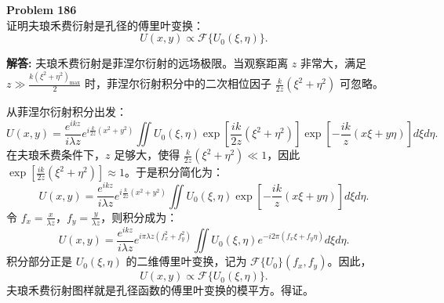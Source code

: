\documentclass[12pt, a4paper, oneside]{ctexart}
\newenvironment{solution}{\par\noindent\textbf{解答:}\quad}{\par}
\begin{document}
\begin{mdframed}[backgroundcolor=gray!10, linewidth=0pt]
    \textbf{Problem 186} \\
    证明夫琅禾费衍射是孔径的傅里叶变换：
    \[
    U(x,y) \propto \mathcal{F} \{ U_0(\xi,\eta) \}.
    \]
\end{mdframed}
\begin{solution}
    夫琅禾费衍射是菲涅尔衍射的远场极限。当观察距离 $z$ 非常大，满足 $z \gg \frac{k (\xi^2+\eta^2)_{\text{max}}}{2}$ 时，菲涅尔衍射积分中的二次相位因子 $\frac{k}{2z}(\xi^2+\eta^2)$ 可忽略。

    从菲涅尔衍射积分出发：
    \[
    U(x,y) = \frac{e^{i k z}}{i\lambda z} e^{i \frac{k}{2z}(x^2+y^2)} \iint U_0(\xi,\eta) \exp\left[ \frac{i k}{2z} (\xi^2+\eta^2) \right] \exp\left[ -\frac{i k}{z} (x\xi + y\eta) \right] d\xi d\eta.
    \]
    在夫琅禾费条件下，$z$ 足够大，使得 $\frac{k}{2z} (\xi^2+\eta^2) \ll 1$，因此 $\exp\left[ \frac{i k}{2z} (\xi^2+\eta^2) \right] \approx 1$。于是积分简化为：
    \[
    U(x,y) = \frac{e^{i k z}}{i\lambda z} e^{i \frac{k}{2z}(x^2+y^2)} \iint U_0(\xi,\eta) \exp\left[ -\frac{i k}{z} (x\xi + y\eta) \right] d\xi d\eta.
    \]
    令 $f_x = \frac{x}{\lambda z}$，$f_y = \frac{y}{\lambda z}$，则积分成为：
    \[
    U(x,y) = \frac{e^{i k z}}{i\lambda z} e^{i \pi \lambda z (f_x^2+f_y^2)} \iint U_0(\xi,\eta) e^{-i 2\pi (f_x \xi + f_y \eta)} d\xi d\eta.
    \]
    积分部分正是 $U_0(\xi,\eta)$ 的二维傅里叶变换，记为 $\mathcal{F}\{U_0\}(f_x, f_y)$。因此，
    \[
    U(x,y) \propto \mathcal{F} \{ U_0(\xi,\eta) \}.
    \]
    夫琅禾费衍射图样就是孔径函数的傅里叶变换的模平方。得证。
\end{solution}
\end{document}
